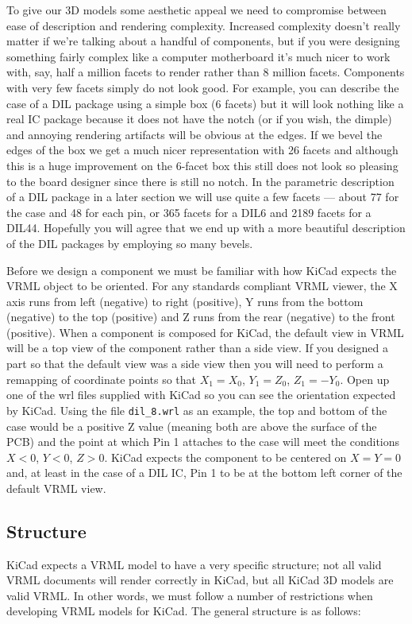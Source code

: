 \documentclass[a4paper]{article}
\begin{document}
To give our 3D models some aesthetic appeal we need to compromise between ease of description and rendering
complexity.  Increased complexity doesn't really matter if we're talking about a handful of components, but if you
were designing something fairly complex like a computer motherboard it's much nicer to work with, say, half a million
facets to render rather than 8 million facets. Components with very few facets simply do not look good. For example, you
can describe the case of a DIL package using a simple box (6 facets) but it will look nothing like a real
IC package because it does not have the notch (or if you wish, the dimple) and annoying rendering artifacts
will be obvious at the edges. If we bevel the edges of the box we get a much nicer representation with 26 facets
and although this is a huge improvement on the 6-facet box this still does not look so pleasing to the
board designer since there is still no notch. In the parametric description of a DIL package in a later section
we will use quite a few facets --- about 77 for the case and 48 for each pin, or 365 facets for a DIL6 and
2189 facets for a DIL44. Hopefully you will agree that we end up with a more beautiful description of the DIL packages
by employing so many bevels.

Before we design a component we must be familiar with how KiCad expects the VRML object to be oriented. For any
standards compliant VRML viewer, the X axis runs from left (negative) to right (positive), Y runs from the
bottom (negative) to the top (positive) and Z runs from the rear (negative) to the front (positive). When a
component is composed for KiCad, the default view in VRML will be a top view of the component rather than a
side view. If you designed a part so that the default view was a side view then you will need to perform a
remapping of coordinate points so that $X_1=X_0$, $Y_1=Z_0$, $Z_1=-Y_0$. Open up one of the wrl files supplied with KiCad so you
can see the orientation expected by KiCad. Using the file \verb~dil_8.wrl~ as an example, the top and
bottom of the case would be a positive Z value (meaning both are above the surface of the PCB) and the point at
which Pin 1 attaches to the case will meet the conditions $X<0$, $Y<0$, $Z>0$. KiCad expects the component to be centered
on $X=Y=0$ and, at least in the case of a DIL IC, Pin 1 to be at the bottom left corner of the default VRML view.

\subsection{Structure}
KiCad expects a VRML model to have a very specific structure; not all valid VRML documents will render
correctly in KiCad, but all KiCad 3D models are valid VRML.  In other words, we must follow a number of
restrictions when developing VRML models for KiCad. The general structure is as follows:
\end{document}
